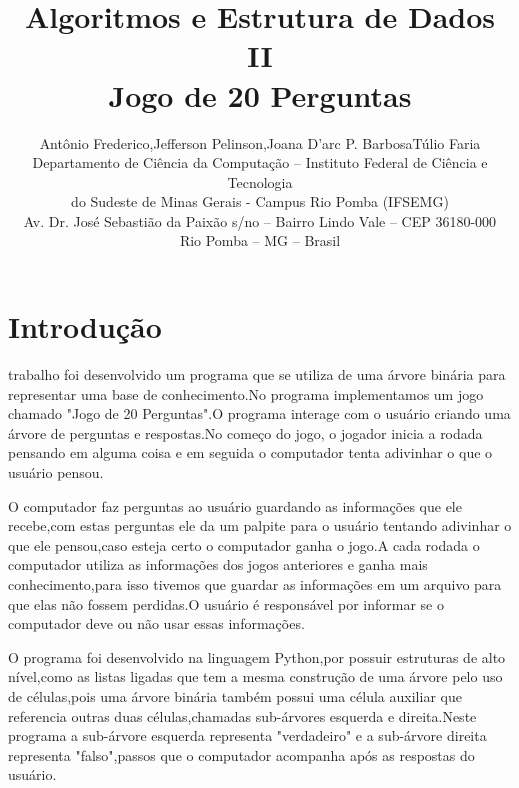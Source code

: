 \documentclass[12pt]{article}
\title{\Large Algoritmos e Estrutura de Dados II\\Jogo de 20 Perguntas}%
\author{Antônio Frederico\inst{1},Jefferson Pelinson\inst{1},Joana D’arc P. Barbosa\inst{1}Túlio Faria\inst{1}
	\\Departamento de Ciência da Computação – Instituto Federal de Ciência e Tecnologia\\
	do Sudeste de Minas Gerais - Campus Rio Pomba (IFSEMG)
	\\
	Av. Dr. José Sebastião da Paixão s/no -- Bairro Lindo Vale -- CEP 36180-000\\
	Rio Pomba -- MG -- Brasil
}
\begin{document}
	


\section{Introdução}
	
trabalho foi desenvolvido um programa que se utiliza de uma árvore binária para representar uma base de conhecimento.No programa implementamos um jogo chamado "Jogo de 20 Perguntas".O programa interage com o usuário criando uma árvore de perguntas e respostas.No começo do jogo, o jogador inicia a rodada pensando em alguma coisa e em seguida o computador tenta adivinhar o que o usuário pensou. 
\par O computador faz perguntas ao usuário guardando as informações que ele recebe,com estas perguntas ele da um palpite para o usuário tentando adivinhar o que ele pensou,caso esteja certo o computador ganha o jogo.A cada rodada o computador utiliza as informações dos jogos anteriores e ganha mais conhecimento,para isso tivemos que guardar as informações em um arquivo para que elas não fossem perdidas.O usuário é responsável por informar se o computador deve ou não usar essas informações.
\par O programa foi desenvolvido na linguagem Python,por possuir estruturas de alto nível,como as listas ligadas que tem a mesma construção de uma árvore pelo uso de células,pois uma árvore binária também possui uma célula auxiliar que referencia outras duas células,chamadas sub-árvores esquerda e direita.Neste programa a sub-árvore esquerda representa "verdadeiro" e a sub-árvore direita representa "falso",passos que o computador acompanha após as respostas do usuário. 
\newpage
\end{document}
